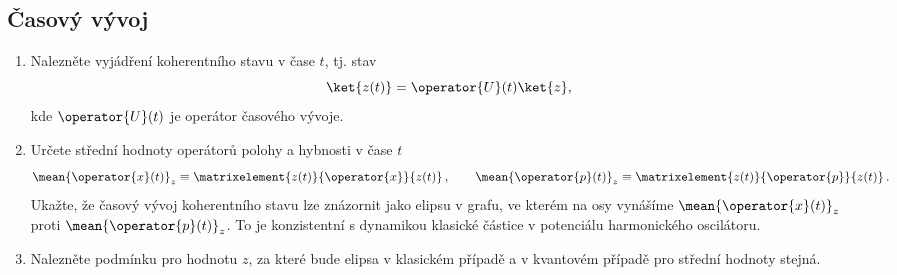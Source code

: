 \subsection{Časový vývoj}
\begin{enumerate}
\item 
    Nalezněte vyjádření koherentního stavu v čase $t$, tj. stav
    \begin{equation}
        \ket{z(t)}=\operator{U}(t)\ket{z},
    \end{equation}
    kde $\operator{U}(t)$ je operátor časového vývoje.

\item 
    Určete střední hodnoty operátorů polohy a hybnosti v čase $t$ 
    \begin{equation}
        \mean{\operator{x}(t)}_{z}\equiv\matrixelement{z(t)}{\operator{x}}{z(t)}\,,
        \qquad\mean{\operator{p}(t)}_{z}\equiv\matrixelement{z(t)}{\operator{p}}{z(t)}\,.
    \end{equation}
    Ukažte, že časový vývoj koherentního stavu lze znázornit jako elipsu v grafu, 
    ve kterém na osy vynášíme $\mean{\operator{x}(t)}_{z}$ proti $\mean{\operator{p}(t)}_{z}$.
    To je konzistentní s dynamikou klasické částice v potenciálu harmonického oscilátoru.

\item 
    Nalezněte podmínku pro hodnotu $z$, 
    za které bude elipsa v klasickém případě a v kvantovém případě pro střední hodnoty stejná.
\end{enumerate}

